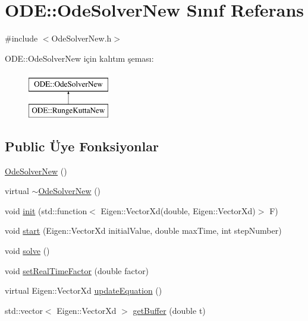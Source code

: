 \hypertarget{classODE_1_1OdeSolverNew}{}\section{O\+DE\+::Ode\+Solver\+New Sınıf Referans}
\label{classODE_1_1OdeSolverNew}


{\ttfamily \#include $<$Ode\+Solver\+New.\+h$>$}

O\+DE\+::Ode\+Solver\+New için kalıtım şeması\+:\begin{figure}[H]
\begin{center}
\leavevmode
\includegraphics[height=2.000000cm]{classODE_1_1OdeSolverNew}
\end{center}
\end{figure}
\subsection*{Public Üye Fonksiyonlar}
\begin{DoxyCompactItemize}
\item 
\mbox{\hyperlink{classODE_1_1OdeSolverNew_aa23301e84c4ad9534f17d0ed2ee34885}{Ode\+Solver\+New}} ()
\item 
virtual \mbox{\hyperlink{classODE_1_1OdeSolverNew_ab16d80c242ea607eff477e4185a0e251}{$\sim$\+Ode\+Solver\+New}} ()
\item 
void \mbox{\hyperlink{classODE_1_1OdeSolverNew_a29b1128975493962d19e5942c816ae10}{init}} (std\+::function$<$ Eigen\+::\+Vector\+Xd(double, Eigen\+::\+Vector\+Xd)$>$ F)
\item 
void \mbox{\hyperlink{classODE_1_1OdeSolverNew_a740f131b3bfb6ba957e33eeaae17ed64}{start}} (Eigen\+::\+Vector\+Xd initial\+Value, double max\+Time, int step\+Number)
\item 
void \mbox{\hyperlink{classODE_1_1OdeSolverNew_ac9286a3fd8b7878f86e6ab7619c8767d}{solve}} ()
\item 
void \mbox{\hyperlink{classODE_1_1OdeSolverNew_aa400dce714b55dc56b37e35f8f8ed89d}{set\+Real\+Time\+Factor}} (double factor)
\item 
virtual Eigen\+::\+Vector\+Xd \mbox{\hyperlink{classODE_1_1OdeSolverNew_ad2ccef6789f3616ca6b277a77deb62f9}{update\+Equation}} ()
\item 
std\+::vector$<$ Eigen\+::\+Vector\+Xd $>$ \mbox{\hyperlink{classODE_1_1OdeSolverNew_abd229873b1f8d7edf1d00188b95c35e6}{get\+Buffer}} (double t)
\end{DoxyCompactItemize}
